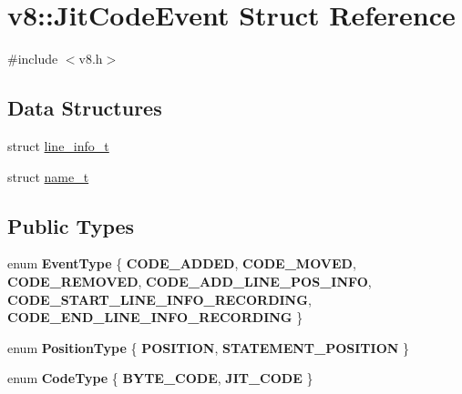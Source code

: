 \hypertarget{structv8_1_1JitCodeEvent}{}\section{v8\+:\+:Jit\+Code\+Event Struct Reference}
\label{structv8_1_1JitCodeEvent}


{\ttfamily \#include $<$v8.\+h$>$}

\subsection*{Data Structures}
\begin{DoxyCompactItemize}
\item 
struct \mbox{\hyperlink{structv8_1_1JitCodeEvent_1_1line__info__t}{line\+\_\+info\+\_\+t}}
\item 
struct \mbox{\hyperlink{structv8_1_1JitCodeEvent_1_1name__t}{name\+\_\+t}}
\end{DoxyCompactItemize}
\subsection*{Public Types}
\begin{DoxyCompactItemize}
\item 
\mbox{\label{structv8_1_1JitCodeEvent_ac4f8e391762567a2710eb5552b5f11f7}} 
enum {\bfseries Event\+Type} \{ \newline
{\bfseries C\+O\+D\+E\+\_\+\+A\+D\+D\+ED}, 
{\bfseries C\+O\+D\+E\+\_\+\+M\+O\+V\+ED}, 
{\bfseries C\+O\+D\+E\+\_\+\+R\+E\+M\+O\+V\+ED}, 
{\bfseries C\+O\+D\+E\+\_\+\+A\+D\+D\+\_\+\+L\+I\+N\+E\+\_\+\+P\+O\+S\+\_\+\+I\+N\+FO}, 
\newline
{\bfseries C\+O\+D\+E\+\_\+\+S\+T\+A\+R\+T\+\_\+\+L\+I\+N\+E\+\_\+\+I\+N\+F\+O\+\_\+\+R\+E\+C\+O\+R\+D\+I\+NG}, 
{\bfseries C\+O\+D\+E\+\_\+\+E\+N\+D\+\_\+\+L\+I\+N\+E\+\_\+\+I\+N\+F\+O\+\_\+\+R\+E\+C\+O\+R\+D\+I\+NG}
 \}
\item 
\mbox{\label{structv8_1_1JitCodeEvent_a02ca6a3e363d0d95142591fd454c8ba9}} 
enum {\bfseries Position\+Type} \{ {\bfseries P\+O\+S\+I\+T\+I\+ON}, 
{\bfseries S\+T\+A\+T\+E\+M\+E\+N\+T\+\_\+\+P\+O\+S\+I\+T\+I\+ON}
 \}
\item 
\mbox{\label{structv8_1_1JitCodeEvent_a28835778c755f5f92afcf57d4e9a5075}} 
enum {\bfseries Code\+Type} \{ {\bfseries B\+Y\+T\+E\+\_\+\+C\+O\+DE}, 
{\bfseries J\+I\+T\+\_\+\+C\+O\+DE}
 \}
\end{DoxyCompactItemize}
